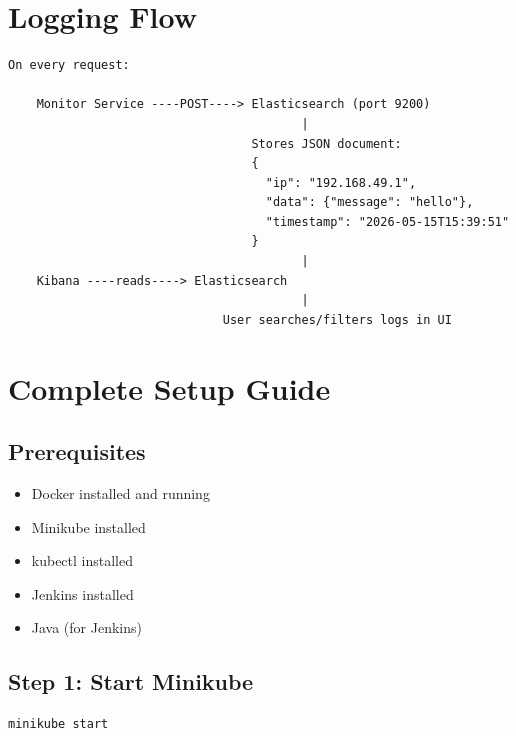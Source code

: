 \documentclass[12pt,a4paper]{article}
\begin{document}
\section{Logging Flow}

\begin{verbatim}
On every request:

    Monitor Service ----POST----> Elasticsearch (port 9200)
                                         |
                                  Stores JSON document:
                                  {
                                    "ip": "192.168.49.1",
                                    "data": {"message": "hello"},
                                    "timestamp": "2026-05-15T15:39:51"
                                  }
                                         |
    Kibana ----reads----> Elasticsearch
                                         |
                              User searches/filters logs in UI
\end{verbatim}

\section{Complete Setup Guide}

\subsection{Prerequisites}

\begin{itemize}
    \item Docker installed and running
    \item Minikube installed
    \item kubectl installed
    \item Jenkins installed
    \item Java (for Jenkins)
\end{itemize}

\subsection{Step 1: Start Minikube}

\begin{lstlisting}[language=bash]
minikube start
\end{lstlisting}
\end{document}
